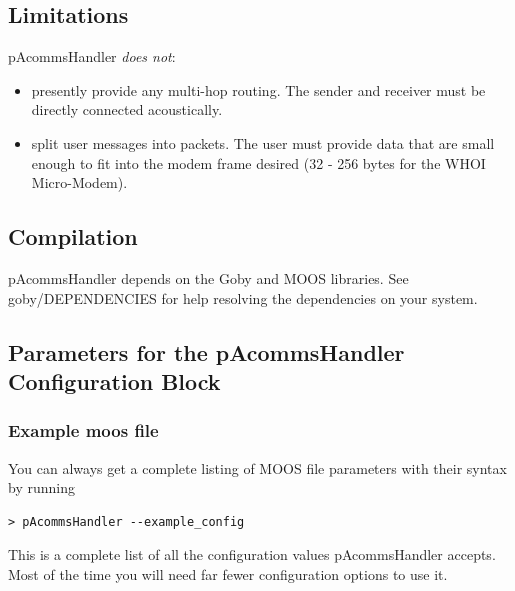 \documentclass[11pt, letterpaper, oneside]{memoir}
\begin{document}
\subsection{Limitations}
pAcommsHandler \textit{does not}:

\begin{itemize}
\item presently provide any multi-hop routing. The sender and receiver must be directly connected acoustically.
\item split user messages into packets. The user must provide data that are small enough to fit into the modem frame desired (32 - 256 bytes for the WHOI Micro-Modem).
\end{itemize} 

\subsection{Compilation}
pAcommsHandler depends on the Goby and MOOS libraries. See goby/DEPENDENCIES for help resolving the dependencies on your system.

\subsection{Parameters for the pAcommsHandler Configuration Block}\label{sec:pAcommsHandler:config}

\subsubsection{Example moos file}

You can always get a complete listing of MOOS file parameters with their syntax by running
\begin{verbatim}
> pAcommsHandler --example_config
\end{verbatim}
\resetbvlinenumber

This is a complete list of all the configuration values pAcommsHandler accepts. Most of the time you will need far fewer configuration options to use it.
\end{document}
